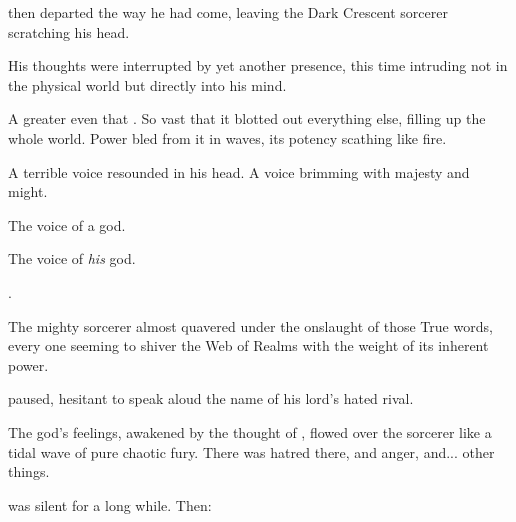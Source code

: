 \Ishnaruchaefir{} then departed the way he had come, leaving the Dark Crescent sorcerer scratching his head. 

His thoughts were interrupted by yet another presence, this time intruding not in the physical world but directly into his mind. 

A \vertex{} greater even that \Ishnaruchaefir. 
So vast that it blotted out everything else, filling up the whole world. 
Power bled from it in waves, its potency scathing like fire. 

A terrible voice resounded in his head. 
A voice brimming with majesty and \daemonic{} might. 

The voice of a god. 

The voice of \emph{his} god. 

\Secherdamon. 


The mighty sorcerer almost quavered under the onslaught of those {True \Draconic} words, every one seeming to shiver the Web of Realms with the weight of its inherent power. 



\Psyrex{} paused, hesitant to speak aloud the name of his lord's hated rival. 


The god's feelings, awakened by the thought of \Ishnaruchaefir, flowed over the sorcerer like a tidal wave of pure chaotic fury. 
There was hatred there, and anger, and... other things. 



\Secherdamon{} was silent for a long while. 
Then: 



